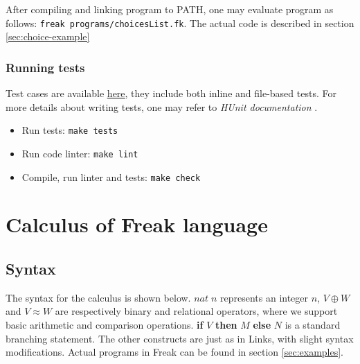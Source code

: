\documentclass[declaration,shortabstract]{iithesis}
\begin{document}
    After compiling and linking program to PATH, one may evaluate program as
    follows: \verb!freak programs/choicesList.fk!. The actual code is described in section \ref{sec:choice-example}

    \subsection{Running tests}

    Test cases are available \href{https://github.com/Tomatosoup97/freak/blob/master/src/Tests.hs}{\underline{here}},
    they include both inline and file-based tests. For more details about
    writing tests, one may refer to \textit{HUnit documentation} \cite{hunit-docs}.

    \begin{itemize}
        \item Run tests: \verb!make tests!
        \item Run code linter: \verb!make lint!
        \item Compile, run linter and tests: \verb!make check!
    \end{itemize}

\chapter{Calculus of Freak language}
\section{Syntax}

    The syntax for the calculus is shown below. $nat \; n$ represents an integer $n$,
    $V \oplus W$ and $V \approx W$ are respectively binary and relational
    operators, where we support basic arithmetic and comparison operations.
    \textbf{if} $V$ \textbf{then} $M$ \textbf{else} $N$ is a standard branching statement.
    The other constructs are just as in Links, with slight syntax modifications.
    Actual programs in Freak can be found in section \ref{sec:examples}.
\end{document}
